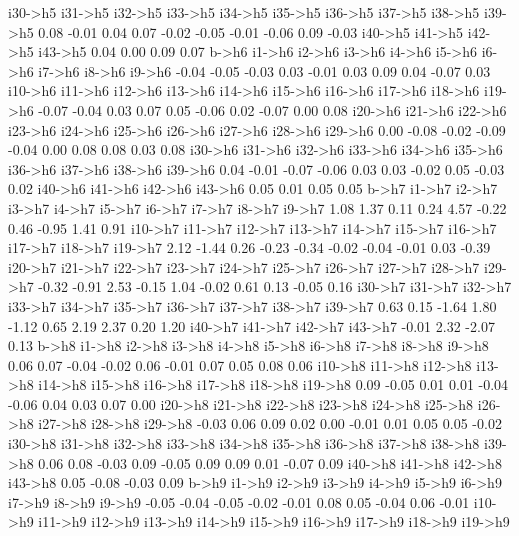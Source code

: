 \documentclass{article}
\begin{document}
\begin{Schunk}
\begin{Soutput}
i30->h5 i31->h5 i32->h5 i33->h5 i34->h5 i35->h5 i36->h5 i37->h5 i38->h5 i39->h5 
   0.08   -0.01    0.04    0.07   -0.02   -0.05   -0.01   -0.06    0.09   -0.03 
i40->h5 i41->h5 i42->h5 i43->h5 
   0.04    0.00    0.09    0.07 
  b->h6  i1->h6  i2->h6  i3->h6  i4->h6  i5->h6  i6->h6  i7->h6  i8->h6  i9->h6 
  -0.04   -0.05   -0.03    0.03   -0.01    0.03    0.09    0.04   -0.07    0.03 
i10->h6 i11->h6 i12->h6 i13->h6 i14->h6 i15->h6 i16->h6 i17->h6 i18->h6 i19->h6 
  -0.07   -0.04    0.03    0.07    0.05   -0.06    0.02   -0.07    0.00    0.08 
i20->h6 i21->h6 i22->h6 i23->h6 i24->h6 i25->h6 i26->h6 i27->h6 i28->h6 i29->h6 
   0.00   -0.08   -0.02   -0.09   -0.04    0.00    0.08    0.08    0.03    0.08 
i30->h6 i31->h6 i32->h6 i33->h6 i34->h6 i35->h6 i36->h6 i37->h6 i38->h6 i39->h6 
   0.04   -0.01   -0.07   -0.06    0.03    0.03   -0.02    0.05   -0.03    0.02 
i40->h6 i41->h6 i42->h6 i43->h6 
   0.05    0.01    0.05    0.05 
  b->h7  i1->h7  i2->h7  i3->h7  i4->h7  i5->h7  i6->h7  i7->h7  i8->h7  i9->h7 
   1.08    1.37    0.11    0.24    4.57   -0.22    0.46   -0.95    1.41    0.91 
i10->h7 i11->h7 i12->h7 i13->h7 i14->h7 i15->h7 i16->h7 i17->h7 i18->h7 i19->h7 
   2.12   -1.44    0.26   -0.23   -0.34   -0.02   -0.04   -0.01    0.03   -0.39 
i20->h7 i21->h7 i22->h7 i23->h7 i24->h7 i25->h7 i26->h7 i27->h7 i28->h7 i29->h7 
  -0.32   -0.91    2.53   -0.15    1.04   -0.02    0.61    0.13   -0.05    0.16 
i30->h7 i31->h7 i32->h7 i33->h7 i34->h7 i35->h7 i36->h7 i37->h7 i38->h7 i39->h7 
   0.63    0.15   -1.64    1.80   -1.12    0.65    2.19    2.37    0.20    1.20 
i40->h7 i41->h7 i42->h7 i43->h7 
  -0.01    2.32   -2.07    0.13 
  b->h8  i1->h8  i2->h8  i3->h8  i4->h8  i5->h8  i6->h8  i7->h8  i8->h8  i9->h8 
   0.06    0.07   -0.04   -0.02    0.06   -0.01    0.07    0.05    0.08    0.06 
i10->h8 i11->h8 i12->h8 i13->h8 i14->h8 i15->h8 i16->h8 i17->h8 i18->h8 i19->h8 
   0.09   -0.05    0.01    0.01   -0.04   -0.06    0.04    0.03    0.07    0.00 
i20->h8 i21->h8 i22->h8 i23->h8 i24->h8 i25->h8 i26->h8 i27->h8 i28->h8 i29->h8 
  -0.03    0.06    0.09    0.02    0.00   -0.01    0.01    0.05    0.05   -0.02 
i30->h8 i31->h8 i32->h8 i33->h8 i34->h8 i35->h8 i36->h8 i37->h8 i38->h8 i39->h8 
   0.06    0.08   -0.03    0.09   -0.05    0.09    0.09    0.01   -0.07    0.09 
i40->h8 i41->h8 i42->h8 i43->h8 
   0.05   -0.08   -0.03    0.09 
  b->h9  i1->h9  i2->h9  i3->h9  i4->h9  i5->h9  i6->h9  i7->h9  i8->h9  i9->h9 
  -0.05   -0.04   -0.05   -0.02   -0.01    0.08    0.05   -0.04    0.06   -0.01 
i10->h9 i11->h9 i12->h9 i13->h9 i14->h9 i15->h9 i16->h9 i17->h9 i18->h9 i19->h9 

\end{Soutput}
\end{Schunk}
\end{document}
